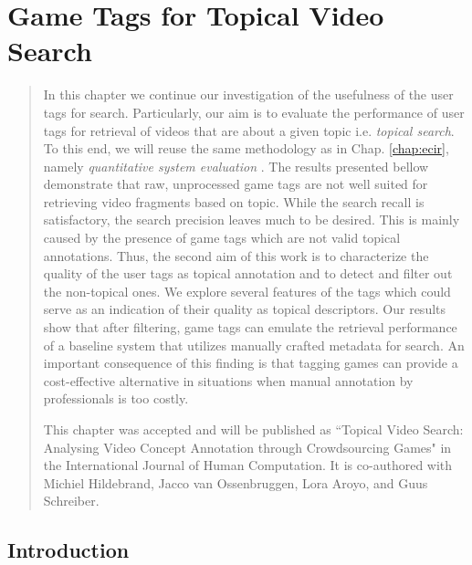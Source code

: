 \chapter{Game Tags for Topical Video Search}\label{chap:topicir-filter}
\begin{quotation}
\noindent
In this chapter we continue our investigation of the usefulness of the user tags for search. Particularly, our aim is to evaluate the performance of user tags for retrieval of videos that are about a given topic i.e. \textit{topical search}. To this end, we will reuse the same methodology as in Chap. \ref{chap:ecir}, namely \textit{quantitative system evaluation} \cite{vorhees}. The results presented bellow demonstrate that raw, unprocessed game tags are not well suited for retrieving video fragments based on topic. While the search recall is satisfactory, the search precision leaves much to be desired. This is mainly caused by the presence of game tags which are not valid topical annotations. Thus, the second aim of this work is to characterize the quality of the user tags as topical annotation and to detect and filter out the non-topical ones. We explore several features of the tags which could serve as an indication of their quality as topical descriptors. Our results show that after filtering, game tags can emulate the retrieval performance of a baseline system that utilizes manually crafted metadata for search. An important consequence of this finding is that tagging games can provide a cost-effective alternative in situations when manual annotation by professionals is too costly.

This chapter was accepted and will be published as ``Topical Video Search: Analysing Video Concept Annotation through Crowdsourcing Games" in the International Journal of Human Computation. It is co-authored with Michiel Hildebrand, Jacco van Ossenbruggen, Lora Aroyo, and Guus Schreiber.


\end{quotation}

\section{Introduction}

